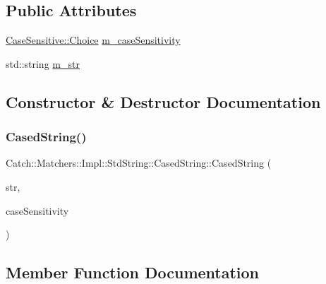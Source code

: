 \subsection*{Public Attributes}
\begin{DoxyCompactItemize}
\item 
\hyperlink{struct_catch_1_1_case_sensitive_aad49d3aee2d97066642fffa919685c6a}{Case\+Sensitive\+::\+Choice} \hyperlink{struct_catch_1_1_matchers_1_1_impl_1_1_std_string_1_1_cased_string_af399ed93051d8981e298206dee6898b3}{m\+\_\+case\+Sensitivity}
\item 
std\+::string \hyperlink{struct_catch_1_1_matchers_1_1_impl_1_1_std_string_1_1_cased_string_a9f8ce063a934330ac59bf8638f047e99}{m\+\_\+str}
\end{DoxyCompactItemize}


\subsection{Constructor \& Destructor Documentation}
\hypertarget{struct_catch_1_1_matchers_1_1_impl_1_1_std_string_1_1_cased_string_aebd017c88423d8a11c62cff85754a22d}{}\label{struct_catch_1_1_matchers_1_1_impl_1_1_std_string_1_1_cased_string_aebd017c88423d8a11c62cff85754a22d} 
\subsubsection{\texorpdfstring{Cased\+String()}{CasedString()}}
{\footnotesize\ttfamily Catch\+::\+Matchers\+::\+Impl\+::\+Std\+String\+::\+Cased\+String\+::\+Cased\+String (\begin{DoxyParamCaption}\item[{std\+::string const \&}]{str,  }\item[{\hyperlink{struct_catch_1_1_case_sensitive_aad49d3aee2d97066642fffa919685c6a}{Case\+Sensitive\+::\+Choice}}]{case\+Sensitivity }\end{DoxyParamCaption})\hspace{0.3cm}{\ttfamily [inline]}}



\subsection{Member Function Documentation}
\hypertarget{struct_catch_1_1_matchers_1_1_impl_1_1_std_string_1_1_cased_string_a8117fdcee8fd8a8e5001b38e0bd19848}{}\label{struct_catch_1_1_matchers_1_1_impl_1_1_std_string_1_1_cased_string_a8117fdcee8fd8a8e5001b38e0bd19848} 
